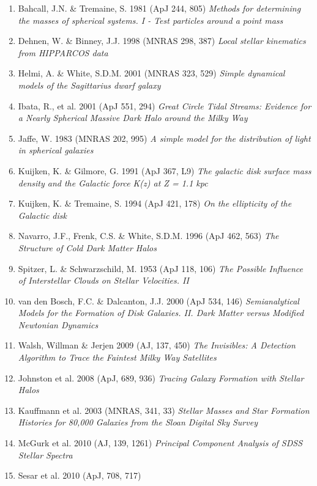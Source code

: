 \documentclass[12pt]{article}
\begin{document}
\begin{enumerate}
\item Bahcall, J.N. \& Tremaine, S. 1981 (ApJ 244, 805)
       {\it Methods for determining the masses of spherical systems. I - Test particles around a point mass}
\item Dehnen, W. \& Binney, J.J. 1998 (MNRAS 298, 387)
          {\it Local stellar kinematics from HIPPARCOS data}
\item Helmi, A. \& White, S.D.M. 2001 (MNRAS 323, 529)
         {\it Simple dynamical models of the Sagittarius dwarf galaxy}
\item Ibata, R., et al. 2001 (ApJ 551, 294)
         {\it Great Circle Tidal Streams: Evidence for a Nearly Spherical Massive Dark Halo around the Milky Way}
\item Jaffe, W. 1983 (MNRAS 202, 995) 
          {\it A simple model for the distribution of light in spherical galaxies}
\item Kuijken, K. \& Gilmore, G. 1991 (ApJ 367, L9)  
     {\it The galactic disk surface mass density and the Galactic force K(z) at Z = 1.1 kpc}
\item Kuijken, K. \& Tremaine, S. 1994 (ApJ 421, 178)
            {\it On the ellipticity of the Galactic disk}
\item Navarro, J.F., Frenk, C.S. \& White, S.D.M. 1996 (ApJ 462, 563) 
         {\it The Structure of Cold Dark Matter Halos}              
\item Spitzer, L. \& Schwarzschild, M. 1953 (ApJ 118, 106) 
           {\it The Possible Influence of Interstellar Clouds on Stellar Velocities. II}
\item van den Bosch, F.C. \& Dalcanton, J.J. 2000 (ApJ 534, 146)
         {\it Semianalytical Models for the Formation of 
               Disk Galaxies. II. Dark Matter versus Modified Newtonian Dynamics}
\item Walsh, Willman \& Jerjen 2009 (AJ, 137, 450) 
   {\it The Invisibles: A Detection Algorithm to Trace the Faintest Milky Way Satellites}  
\item Johnston et al. 2008 (ApJ, 689, 936)
    {\it Tracing Galaxy Formation with Stellar Halos}
\item  Kauffmann et al. 2003 (MNRAS, 341, 33) 
   {\it Stellar Masses and Star Formation Histories for 80,000 Galaxies from the Sloan Digital Sky Survey} 
\item McGurk et al. 2010 (AJ, 139, 1261) 
     {\it Principal Component Analysis of SDSS Stellar Spectra}
\item Sesar et al. 2010 (ApJ, 708, 717)

\end{enumerate}
\end{document}
